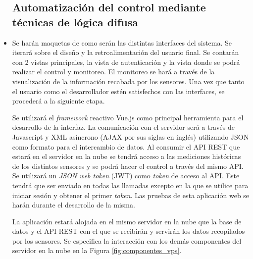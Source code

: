 \begin{itemize}
\subsection{Automatización del control mediante técnicas de lógica difusa}




	\item Se harán maquetas de como serán las distintas interfaces del sistema. Se iterará sobre el diseño y la retroalimentación del usuario final. Se contarán con 2 vistas principales, la vista de autenticación y la vista donde se podrá realizar el control y monitoreo. El monitoreo se hará a través de la visualización de la información recabada por los sensores. Una vez que tanto el usuario como el desarrollador estén satisfechos con las interfaces, se procederá a la siguiente etapa.

	Se utilizará el \textit{framework} reactivo Vue.js como principal herramienta para el desarrollo de la interfaz. La comunicación con el servidor será a través de Javascript y XML asíncrono (AJAX por sus siglas en inglés) utilizando JSON como formato para el intercambio de datos. Al consumir el API REST que estará en el servidor en la nube se tendrá acceso a las mediciones históricas de los distintos sensores y se podrá hacer el control a través del mismo API. Se utilizará un \textit{JSON web token} (JWT) como \textit{token} de acceso al API. Este tendrá que ser enviado en todas las llamadas excepto en la que se utilice para iniciar sesión y obtener el primer \textit{token}. Las pruebas de esta aplicación web se harán durante el desarrollo de la misma.

	La aplicación estará alojada en el mismo servidor en la nube que la base de datos y el API REST con el que se recibirán y servirán los datos recopilados por los sensores. Se especifica la interacción con los demás componentes del servidor en la nube en la Figura \ref{fig:componentes_vps}.
\end{itemize}





